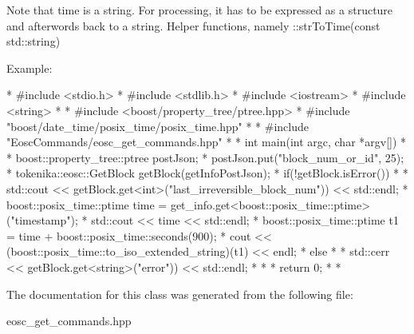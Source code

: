 Note that time is a string. For processing, it has to be expressed as a structure and afterwords back to a string. Helper functions, namely \+::str\+To\+Time(const std\+::string)

Example\+:

\begin{DoxyVerb}* #include <stdio.h>
* #include <stdlib.h>
* #include <iostream>
* #include <string>
* 
* #include <boost/property_tree/ptree.hpp>
* #include "boost/date_time/posix_time/posix_time.hpp"
* 
* #include "EoscCommands/eosc_get_commands.hpp"  
* 
* int main(int argc, char *argv[])
* {
* boost::property_tree::ptree postJson;
* postJson.put("block_num_or_id", 25);
* tokenika::eosc::GetBlock getBlock(getInfoPostJson);
* if(!getBlock.isError())
* {
*    std::cout << getBlock.get<int>("last_irreversible_block_num")) << std::endl;
*    boost::posix_time::ptime time = get_info.get<boost::posix_time::ptime>("timestamp");
*    std::cout << time << std::endl;
*    boost::posix_time::ptime t1 = time + boost::posix_time::seconds(900);
*    cout << (boost::posix_time::to_iso_extended_string)(t1) << endl;
* } else
* {
*    std::cerr << getBlock.get<string>("error")) << std::endl;
* }
* 
* return 0;
* }
* \end{DoxyVerb}
 

The documentation for this class was generated from the following file\+:\begin{DoxyCompactItemize}
\item 
eosc\+\_\+get\+\_\+commands.\+hpp\end{DoxyCompactItemize}
